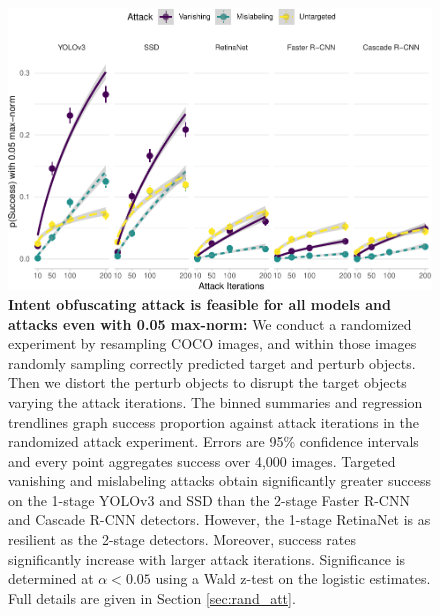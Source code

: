 \begin{figure}[tb]

{\centering \includegraphics[width=1\linewidth]{imgs/success_trend_graph_normed} 

}

\caption{\textbf{Intent obfuscating attack is feasible for all models and attacks even with 0.05 max-norm:}  We conduct a randomized experiment by resampling COCO images, and within those images randomly sampling correctly predicted target and perturb objects. Then we distort the perturb objects to disrupt the target objects varying the attack iterations. The binned summaries and regression trendlines graph success proportion against attack iterations in the randomized attack experiment. Errors are 95\% confidence intervals and every point aggregates success over 4,000 images. Targeted vanishing and mislabeling attacks obtain significantly greater success on the 1-stage YOLOv3 and SSD than the 2-stage Faster R-CNN and Cascade R-CNN detectors. However, the 1-stage RetinaNet is as resilient as the 2-stage detectors. Moreover, success rates significantly increase with larger attack iterations. Significance is determined at $\alpha < 0.05$ using a Wald z-test on the logistic estimates. Full details are given in Section \ref{sec:rand_att}.}\label{fig:success_trend_graph_normed}
\end{figure}
